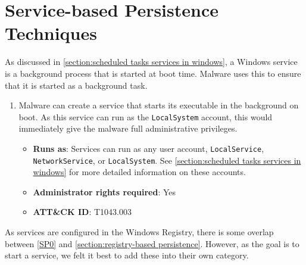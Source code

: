 \section{Service-based Persistence Techniques}\label{section:service-based persistence}
As discussed in \autoref{section:scheduled tasks services in windows}, a Windows service is a background process that is started at boot time. Malware uses this to ensure that it is started as a background task.

\begin{enumerate}[label={\textbf{SP\arabic*}:}, ref=SP\arabic*, start=0]
    \item \label{SP0} Malware can create a service that starts its executable in the background on boot. As this service can run as the \texttt{LocalSystem} account, this would immediately give the malware full administrative privileges.

    \begin{itemize}[label={}, leftmargin=*]
        \item \textbf{Runs as}: Services can run as any user account, \texttt{LocalService}, \texttt{NetworkService}, or \texttt{LocalSystem}. See \autoref{section:scheduled tasks services in windows} for more detailed information on these accounts.

        \item \textbf{Administrator rights required}: Yes

        \item \textbf{ATT\&CK ID}: T1043.003
    \end{itemize}
\end{enumerate}

As services are configured in the Windows Registry, there is some overlap between \autoref{SP0} and \autoref{section:registry-based persistence}. However, as the goal is to start a service, we felt it best to add these into their own category.

